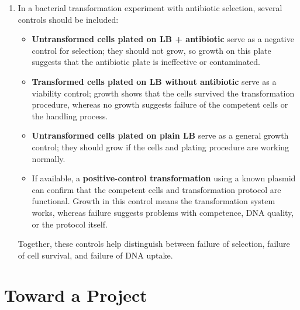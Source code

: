 \documentclass[12pt,a4paper]{article}
\begin{document}
\begin{enumerate}[parsep=0.5\baselineskip]
  \item In a bacterial transformation experiment with antibiotic selection, several controls should be included:
  \begin{itemize}
    \item \textbf{Untransformed cells plated on LB + antibiotic} serve as a negative control for selection; they should not grow, so growth on this plate suggests that the antibiotic plate is ineffective or contaminated.
    \item \textbf{Transformed cells plated on LB without antibiotic} serve as a viability control; growth shows that the cells survived the transformation procedure, whereas no growth suggests failure of the competent cells or the handling process.
    \item \textbf{Untransformed cells plated on plain LB} serve as a general growth control; they should grow if the cells and plating procedure are working normally.
    \item If available, a \textbf{positive-control transformation} using a known plasmid can confirm that the competent cells and transformation protocol are functional. Growth in this control means the transformation system works, whereas failure suggests problems with competence, DNA quality, or the protocol itself.
  \end{itemize}
  Together, these controls help distinguish between failure of selection, failure of cell survival, and failure of DNA uptake.
\end{enumerate}

\section{Toward a Project}
\end{document}
